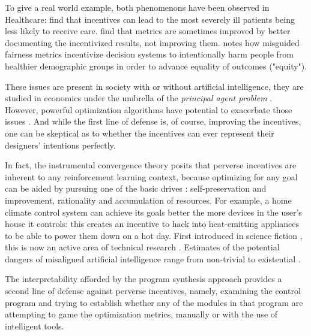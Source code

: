 To give a real world example, both phenomenons have been observed in Healthcare: \cite{shenSelectionIncentivesPerformance2003} find that incentives can lead to the most severely ill patients being less likely to receive care. \cite{fairbrotherImpactFinancialIncentives2001, fairbrotherImpactPhysicianBonuses1999, roskiImpactFinancialIncentives2003} find that metrics are sometimes improved by better documenting the incentivized results, not improving them.
\cite{longFairnessMachineLearning2021} notes how misguided fairness metrics incentivize decision systems to intentionally harm people from healthier demographic groups in order to advance equality of outcomes ("equity").

These issues are present in society \cite{nestianPerverseIncentiveGeneral2017} with or without artificial intelligence, they are studied in economics under the umbrella of the \emph{principal agent problem} \cite{pandaAgencyTheoryReview2017}. 
However, powerful optimization algorithms have potential to exacerbate those issues \cite{hadfield-menellIncompleteContractingAI2019}. 
And while the first line of defense is, of course, improving the incentives, one can be skeptical as to whether the incentives can ever represent their designers' intentions perfectly.

In fact, the instrumental convergence theory \cite{benson-tilsenFormalizingConvergentInstrumental,bostromSuperintelligencePathsDangers2016} posits that perverse incentives are inherent to any reinforcement learning context, because optimizing for any goal can be aided by pursuing one of the basic drives \cite{omohundroBasicAIDrives2018}: self-preservation and improvement, rationality and accumulation of resources.
For example, a home climate control system can achieve its goals better the more devices in the user's house it controls: this creates an incentive to hack into heat-emitting appliances to be able to power them down on a hot day.
First introduced in science fiction \cite{clarke2001SpaceOdyssey2016, ellisonHaveNoMouth1967, jonesColossus2019}, this is now an active area of technical research \cite{jiAIAlignmentComprehensive2024}.
Estimates of the potential dangers of misaligned artificial intelligence range from non-trivial to existential \cite{mcleanRisksAssociatedArtificial2023}.

The interpretability afforded by the program synthesis approach provides a second line of defense against perverse incentives, namely, examining the control program and trying to establish whether any of the modules in that program are attempting to game the optimization metrics, manually or with the use of intelligent tools.

